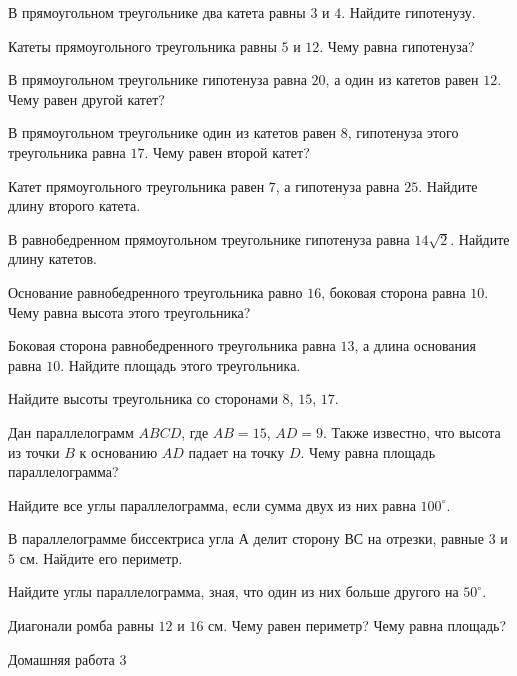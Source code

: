 
\begin{class}[number=6]
	\begin{listofex}
		\item В прямоугольном треугольнике два катета равны \( 3 \) и \(  4 \). Найдите гипотенузу.
		\item Катеты прямоугольного треугольника равны \( 5 \) и \( 12 \). Чему равна гипотенуза?
		\item В прямоугольном треугольнике гипотенуза равна \( 20 \), а один из катетов равен \( 12 \). Чему равен другой катет?
		\item В прямоугольном треугольнике один из катетов равен \( 8 \), гипотенуза этого треугольника равна \( 17 \). Чему равен второй катет?
		\item Катет прямоугольного треугольника равен \( 7 \), а гипотенуза равна \( 25 \). Найдите длину второго катета.
		\item В равнобедренном прямоугольном треугольнике гипотенуза равна  \( 14\sqrt{2} \). Найдите длину катетов.
		\item Основание равнобедренного треугольника равно \( 16 \), боковая сторона равна \( 10 \). Чему равна высота этого треугольника?
		\item Боковая сторона равнобедренного треугольника равна \( 13 \), а длина основания равна \( 10 \). Найдите площадь этого треугольника.
		\item Найдите высоты треугольника со сторонами \( 8 \), \( 15 \), \( 17 \).
		\item Дан параллелограмм \( ABCD \), где \( AB=15 \), \( AD=9 \). Также известно, что высота из точки \( B \) к основанию \( AD \) падает на точку \( D \). Чему равна площадь параллелограмма?
		\item Найдите все углы параллелограмма, если сумма двух из них равна \( 100^{\circ}\).
		\item В параллелограмме биссектриса угла \( А \) делит сторону \( ВС  \) на отрезки, равные \( 3 \) и \( 5  \) см. Найдите его периметр.
		\item Найдите углы параллелограмма, зная, что один из них больше другого на \( 50^{\circ} \).
		\item Диагонали ромба равны \( 12 \) и \( 16 \) см. Чему равен периметр? Чему равна площадь? 
	\end{listofex}
\end{class}

\begin{homework}[number=3]
	\begin{listofex}
		\item Домашняя работа 3
	\end{listofex}
\end{homework}

